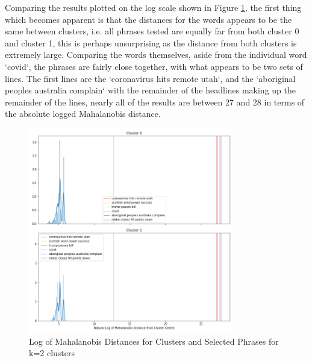 Comparing the results plotted on the log scale shown in Figure \ref{fig:wordsk2}, the first thing which becomes apparent is that the distances for the words appears to be the same between clusters, i.e. all phrases tested are equally far from both cluster 0 and cluster 1, this is perhaps unsurprising as the distance from both clusters is extremely large. Comparing the words themselves, aside from the individual word `covid`, the phrases are fairly close together, with what appears to be two sets of lines. The first lines are the `coronavirus hits remote utah`, and the `aboriginal peoples australia complain` with the remainder of the headlines making up the remainder of the lines, nearly all of the results are between 27 and 28 in terms of the absolute logged Mahalanobis distance. 
\begin{figure}[H]
	\centering
	\includegraphics[width=0.8\textwidth]{images/words_kmeans_mahalanobis_distance_k=2.png}
	\caption{Log of Mahalanobis Distances for Clusters and Selected Phrases for k=2 clusters}
	\label{fig:wordsk2}
\end{figure}

